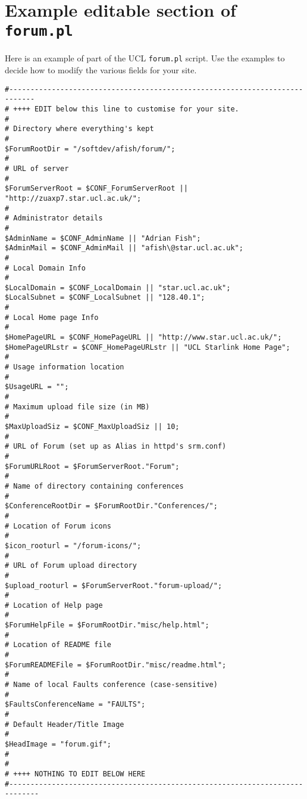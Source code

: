 \documentclass[11pt]{article}
\begin{document}
\newpage
\appendix

\section{Example editable section of {\tt forum.pl}}
\label{perlmods}

Here is an example of part of the UCL {\tt forum.pl} script. Use the examples
to decide how to modify the various fields for your site.

\begin{verbatim}
#----------------------------------------------------------------------------
# ++++ EDIT below this line to customise for your site.
#
# Directory where everything's kept
#
$ForumRootDir = "/softdev/afish/forum/";
#
# URL of server
#
$ForumServerRoot = $CONF_ForumServerRoot || "http://zuaxp7.star.ucl.ac.uk/";
#
# Administrator details
#
$AdminName = $CONF_AdminName || "Adrian Fish";
$AdminMail = $CONF_AdminMail || "afish\@star.ucl.ac.uk";
#
# Local Domain Info
#
$LocalDomain = $CONF_LocalDomain || "star.ucl.ac.uk";
$LocalSubnet = $CONF_LocalSubnet || "128.40.1";
#
# Local Home page Info
#
$HomePageURL = $CONF_HomePageURL || "http://www.star.ucl.ac.uk/";
$HomePageURLstr = $CONF_HomePageURLstr || "UCL Starlink Home Page";
#
# Usage information location
#
$UsageURL = "";
#
# Maximum upload file size (in MB)
#
$MaxUploadSiz = $CONF_MaxUploadSiz || 10;
#
# URL of Forum (set up as Alias in httpd's srm.conf)
#
$ForumURLRoot = $ForumServerRoot."Forum";
#
# Name of directory containing conferences
#
$ConferenceRootDir = $ForumRootDir."Conferences/";
#
# Location of Forum icons
#
$icon_rooturl = "/forum-icons/";
#
# URL of Forum upload directory
#
$upload_rooturl = $ForumServerRoot."forum-upload/";
#
# Location of Help page
#
$ForumHelpFile = $ForumRootDir."misc/help.html";
#
# Location of README file
#
$ForumREADMEFile = $ForumRootDir."misc/readme.html";
#
# Name of local Faults conference (case-sensitive)
#
$FaultsConferenceName = "FAULTS";
#
# Default Header/Title Image
#
$HeadImage = "forum.gif";
#
#
# ++++ NOTHING TO EDIT BELOW HERE
#-----------------------------------------------------------------------------
\end{verbatim}
\end{document}
